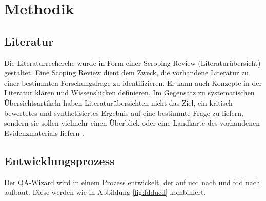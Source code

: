 \documentclass[11pt,        %
  english,ngerman,          %
  paper=a4,                 %
  captions=tablesignature,  %
  listof=numbered,          %
  bibliography=totoc,       %
  headings=small,           %
  headinclude=false,        %
  footinclude=false,        %
  parskip=half-,            %
  oneside,                  %
  BCOR=15mm,                 %
  DIV=12                    %
  ]{scrbook}                %
\begin{document}
\chapter{Methodik}\label{sec:approach}

  
\section{Literatur}\label{sec:lit_method}

Die Literaturrecherche wurde in Form einer Scroping Review (Literaturübersicht) gestaltet. Eine Scoping Review dient dem Zweck, die vorhandene Literatur zu einer bestimmten Forschungsfrage zu identifizieren. Er kann auch Konzepte in der Literatur klären und Wissenslücken definieren. Im Gegensatz zu systematischen Übersichtsartikeln haben Literaturübersichten nicht das Ziel, ein kritisch bewertetes und synthetisiertes Ergebnis auf eine bestimmte Frage zu liefern, sondern sie sollen vielmehr einen Überblick oder eine Landkarte des vorhandenen Evidenzmaterials liefern \citep{Munn_ea-2018-scoping_reivews}.


\section{Entwicklungsprozess}\label{sec:hcd_method}

Der QA-Wizard wird in einem Prozess entwickelt, der auf \gls{ucd} nach \cite{norman_draper-1986-ucd} und \gls{fdd} nach \cite{Coad.ea-1999-java_modeling_uml} aufbaut. Diese werden wie in Abbildung \ref{fig:fdducd} kombiniert.
\end{document}

